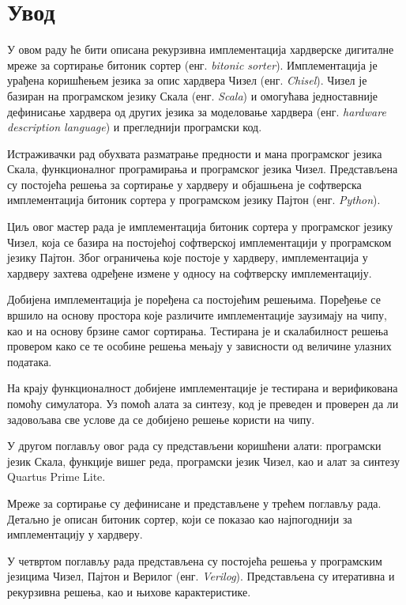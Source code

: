 \documentclass[12pt, a4paper]{article}
\theoremstyle{definition}
\begin{document}
\tableofcontents
\newpage

\section{Увод}
У овом раду ће бити описана рекурзивна имплементација хардверске дигиталне мреже за сортирање битоник сортер (енг. \textit{bitonic sorter}). Имплементација је урађена коришћењем језика за опис хардвера Чизел (енг. \textit{Chisel}). Чизел је базиран на програмском језику Скала (енг. \textit{Scala}) и омогућава једноставније дефинисање хардвера од других језика за моделовање хардвера (енг. \textit{hardware description language}) и прегледнији програмски код.

Истраживачки рад обухвата разматрање предности и мана програмског језика Скала, функционалног програмирања и програмског језика Чизел. Представљена су постојећа решења за сортирање у хардверу и објашњена је софтверска имплементација битоник сортера у програмском језику Пајтон (енг. \textit{Python}).

Циљ овог мастер рада је имплементација битоник сортера у програмског језику Чизел, која се базира на постојећој софтверској имплементацији у програмском језику Пајтон. Због ограничења које постоје у хардверу, имплементација у хардверу захтева одређене измене у односу на софтверску имплементацију. 

Добијена имплементација је поређена са постојећим решењима. Поређење се вршило на основу простора које различите имплементације заузимају на чипу, као и на основу брзине самог сортирања. Тестирана је и скалабилност решења провером како се те особине решења мењају у зависности од величине улазних података.


На крају функционалност добијене имплементације је тестирана и верификована помоћу симулатора. Уз помоћ алата за синтезу, код је преведен и проверен да ли задовољава све услове да се добијено решење користи на чипу. 

У другом поглављу овог рада су представљени коришћени алати: програмски језик Скала, функције вишег реда, програмски језик Чизел, као и алат за синтезу Quartus Prime Lite.

Мреже за сортирање су дефинисане и представљене у трећем поглављу рада. Детаљно је описан битоник сортер, који се показао као најпогоднији за имплементацију у хардверу.

У четвртом поглављу рада представљена су постојећа решења у програмским језицима Чизел, Пајтон и Верилог (енг. \textit{Verilog}). Представљена су итеративна и рекурзивна решења, као и њихове карактеристике.
\end{document}
